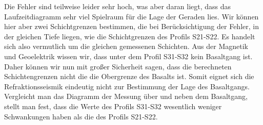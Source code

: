 



Die Fehler sind teilweise leider sehr hoch, was aber daran liegt, dass das Laufzeitdiagramm sehr viel Spielraum für die Lage der Geraden lies. Wir können hier aber zwei Schichtgrenzen bestimmen, die bei Berücksichtigung der Fehler, in der gleichen Tiefe liegen, wie die Schichtgrenzen des Profils S21-S22. Es handelt sich also vermutlich um die gleichen gemessenen Schichten. Aus der Magnetik und Geoelektrik wissen wir, dass unter dem Profil S31-S32 kein Basaltgang ist. Daher können wir nun mit großer Sicherheit sagen, dass die berechneten Schichtengrenzen nicht die die Obergrenze des Basalts ist. Somit eignet sich die Refraktionsseismik eindeutig nicht zur Bestimmung der Lage des Basaltgangs. Vergleicht man das Diagramm der Messung über und neben dem Basaltgang, stellt man fest, dass die Werte des Profils S31-S32 wesentlich weniger Schwankungen haben als die des Profils S21-S22.


